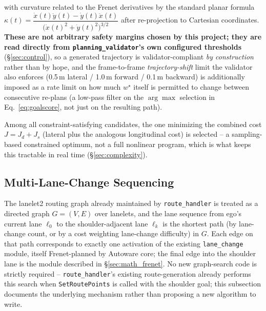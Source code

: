 \documentclass[11pt]{article}
\newcommand{\code}[1]{\texttt{#1}}
\newcommand{\pkg}[1]{\texttt{#1}}
\begin{document}
with curvature related to the Frenet derivatives by the standard planar formula
$\kappa(t) = \dfrac{\dot x(t)\ddot y(t) - \dot y(t)\ddot x(t)}{\big(\dot x(t)^2+\dot y(t)^2\big)^{3/2}}$
after re-projection to Cartesian coordinates. \textbf{These are not arbitrary safety margins chosen
by this project; they are read directly from \pkg{planning\_validator}'s own configured thresholds}
(\S\ref{sec:control}), so a generated trajectory is validator-compliant \emph{by construction}
rather than by hope, and the frame-to-frame \emph{trajectory-shift} limit the validator also enforces
(0.5\,m lateral / 1.0\,m forward / 0.1\,m backward) is additionally imposed as a rate limit on how
much $w^\star$ itself is permitted to change between consecutive re-plans (a low-pass filter on the
$\arg\max$ selection in Eq.~\ref{eq:goalscore}, not just on the resulting path).

Among all constraint-satisfying candidates, the one minimizing the combined cost
$J = J_d + J_s$ (lateral plus the analogous longitudinal cost) is selected -- a sampling-based
constrained optimum, not a full nonlinear program, which is what keeps this tractable in real time
(\S\ref{sec:complexity}).

\subsection{Multi-Lane-Change Sequencing}
The lanelet2 routing graph already maintained by \code{route\_handler} is treated as a directed
graph $G=(V,E)$ over lanelets, and the lane sequence from ego's current lane $\ell_0$ to the
shoulder-adjacent lane $\ell_k$ is the shortest path (by lane-change count, or by a cost weighting
lane-change difficulty) in $G$. Each edge on that path corresponds to exactly one activation of the
existing \pkg{lane\_change} module, itself Frenet-planned by Autoware core; the final edge into the
shoulder lane is the module described in \S\ref{sec:math_frenet}. No new graph-search code is
strictly required -- \code{route\_handler}'s existing route-generation already performs this search
when \code{SetRoutePoints} is called with the shoulder goal; this subsection documents the
underlying mechanism rather than proposing a new algorithm to write.
\end{document}
